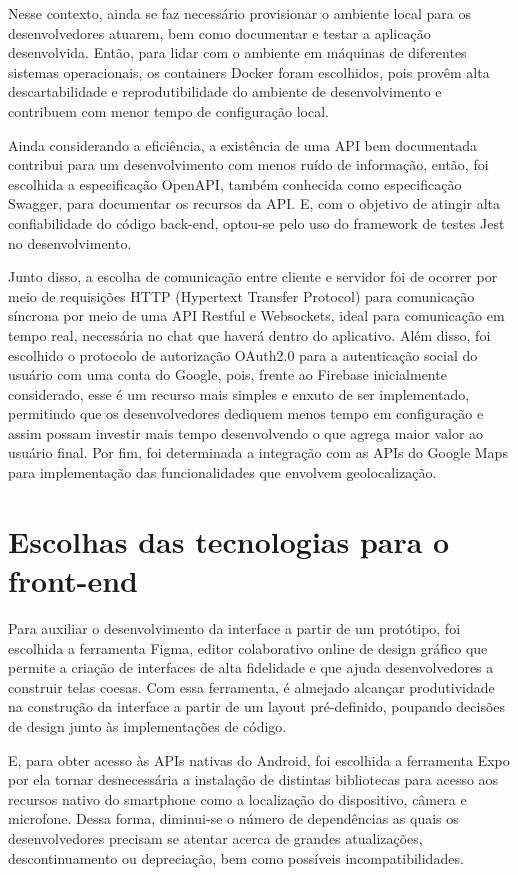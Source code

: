 Nesse contexto, ainda se faz necessário provisionar o ambiente local para os desenvolvedores atuarem, bem como documentar e testar a aplicação desenvolvida. Então, para lidar com o ambiente em máquinas de diferentes sistemas operacionais, os containers Docker foram escolhidos, pois provêm alta descartabilidade e reprodutibilidade do ambiente de desenvolvimento e contribuem com menor tempo de configuração local. 

Ainda considerando a eficiência, a existência de uma API bem documentada contribui para um desenvolvimento com menos ruído de informação, então, foi escolhida a especificação OpenAPI, também conhecida como especificação Swagger, para documentar os recursos da API. E, com o objetivo de atingir alta confiabilidade do código back-end, optou-se pelo uso do framework de testes Jest no desenvolvimento.

Junto disso, a escolha de comunicação entre cliente e servidor foi de ocorrer por meio de requisições HTTP (Hypertext Transfer Protocol) para comunicação síncrona por meio de uma API Restful e Websockets, ideal para comunicação em tempo real, necessária no chat que haverá dentro do aplicativo. 
Além disso, foi escolhido o protocolo de autorização OAuth2.0 para a autenticação social do usuário com uma conta do Google, pois, frente ao Firebase inicialmente considerado, esse é um recurso mais simples e enxuto de ser implementado, permitindo que os desenvolvedores dediquem menos tempo em configuração e assim possam investir mais tempo desenvolvendo o que agrega maior valor ao usuário final. Por fim, foi determinada a integração com as APIs do Google Maps para implementação das funcionalidades que envolvem geolocalização. 


\section{Escolhas das tecnologias para o front-end}
Para auxiliar o desenvolvimento da interface a partir de um  protótipo, foi escolhida a ferramenta Figma, editor colaborativo online de design gráfico que permite a criação de interfaces de alta fidelidade e que ajuda desenvolvedores a construir telas coesas. Com essa ferramenta, é almejado alcançar produtividade na construção da interface a partir de um layout pré-definido, poupando decisões de design junto às implementações de código.

E, para obter acesso às APIs nativas do Android, foi escolhida a ferramenta Expo por ela tornar desnecessária a instalação de distintas bibliotecas para acesso aos recursos nativo do smartphone como a localização do dispositivo, câmera e microfone. Dessa forma, diminui-se o número de dependências as quais os desenvolvedores precisam se atentar acerca de grandes atualizações, descontinuamento ou depreciação, bem como possíveis incompatibilidades.

